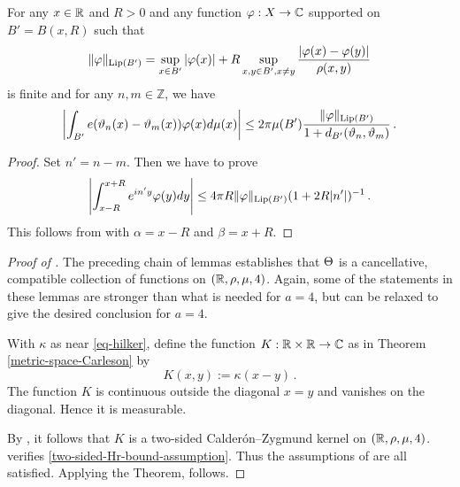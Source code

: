 \begin{lemma}
\label{real-van-der-Corput}
\leanok
{}
    For any $x\in {\mathbb{R}}$ and $R>0$ and any
    function $\varphi: X\to {\mathbb{C}}$ supported on $B'=B(x,R)$
    such that
\begin{equation}
    \|\varphi\|_{\operatorname{\operatorname{Lip}}(B')} = \sup_{x \in B'} |\varphi(x)| + R \sup_{x,y \in B', x \neq y} \frac{|\varphi(x) - \varphi(y)|}{\rho(x,y)}
\end{equation}
is finite and for any $n,m\in \mathbb{Z}$, we have
\begin{equation}
    \label{eq-vdc-cond1}
    \left|\int_{B'} e({\vartheta}_n(x)-{{\vartheta}_m(x)}) \varphi(x) d\mu(x)\right|\le 2\pi \mu(B')\frac{\|\varphi\|_{\operatorname{\operatorname{Lip}}(B')}}{1+d_{B'}({\vartheta}_n,{\vartheta}_m)}
\, .
\end{equation}
\end{lemma}
\begin{proof}
    \leanok
Set $n'=n-m$. Then we have to prove
\begin{equation}
    \label{eq-vdc-cond2}
    \left|\int_{x-R}^{x+R} e^{in'y}\varphi(y) dy\right|\le 4\pi R\|\varphi\|_{\operatorname{\operatorname{Lip}}(B')}
(1+2R|n'|)^{-1}\, .
\end{equation}
This follows from  with $\alpha = x - R$ and $\beta = x + R$.
\end{proof}

\begin{proof}[Proof of ]
\leanok

The preceding chain of lemmas establishes that ${\Theta}$ is a cancellative, compatible collection of functions on $({\mathbb{R}}, \rho, \mu, 4)$. Again, some of the statements in these lemmas are stronger than what is needed for $a=4$, but can be relaxed to give the desired conclusion for $a=4$.

With $\kappa$ as near \eqref{eq-hilker}, define
the function $K:{\mathbb{R}}\times {\mathbb{R}}\to \mathbb{C}$ as in Theorem
\ref{metric-space-Carleson} by
\begin{equation}
    K(x,y):=\kappa(x-y)\, .
\end{equation}
The function $K$ is continuous outside the diagonal
$x=y$ and vanishes on the diagonal. Hence it is measurable.


By , it follows that $K$ is a two-sided Calder\'on--Zygmund kernel on $({\mathbb{R}},\rho,\mu,4)$.
 verifies \eqref{two-sided-Hr-bound-assumption}.
Thus the assumptions of  are all satisfied. Applying the Theorem,  follows.

\end{proof}


\printbibliography
